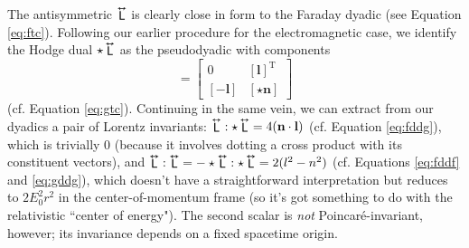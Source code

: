 \documentclass[12pt]{article}
\renewcommand{\vv}[1]{\mathbf{#1}}
\newcommand{\tightoverset}[2]{%
  \mathop{#2}\limits^{\vbox to -.5ex{\kern-0.75ex\hbox{$#1$}\vss}}}
\newcommand{\inlinedy}[1]{\tightoverset{\text{\tiny$\bm\leftrightarrow$}}{#1}}
\newcommand{\capdy}[1]{ \overset{ \text{\tiny$\bm\leftrightarrow$} }{\vphantom{\text{\small{A}}}\smash{#1}} }
\begin{document}
The antisymmetric $\inlinedy{\mathsf{L}}$ is clearly close in form to the Faraday dyadic (see Equation \ref{eq:ftc}). Following our earlier procedure for the electromagnetic case, we identify the Hodge dual $\star \inlinedy{\mathsf{L}}$ as the pseudodyadic with components
\begin{equation*}
[ \star \capdy{\mathsf{L}} ]
=
\begin{bmatrix}
0 & [ \vv l ]^\mathrm{T} \\[1ex]
[ - \vv l ] & [ \star \vv n ]
\end{bmatrix}
\end{equation*}
(cf. Equation \ref{eq:gtc}). Continuing in the same vein, we can extract from our dyadics a pair of Lorentz invariants: $\inlinedy{\mathsf{L}} : \star \inlinedy{\mathsf{L}} =  4 ( \vv n \cdot \vv l )$ (cf. Equation \ref{eq:fddg}), which is trivially $0$ (because it involves dotting a cross product with its constituent vectors), and $\inlinedy{\mathsf{L}} : \inlinedy{\mathsf{L}} = - \star \inlinedy{\mathsf{L}} : \star \inlinedy{\mathsf{L}} = 2 ( l^2 - n^2 )$ (cf. Equations \ref{eq:fddf} and \ref{eq:gddg}), which doesn't have a straightforward interpretation but reduces to $2E_0^2 r^2$ in the center-of-momentum frame (so it's got something to do with the relativistic ``center of energy"). The second scalar is \emph{not} Poincar\'e-invariant, however; its invariance depends on a fixed spacetime origin.
\end{document}
